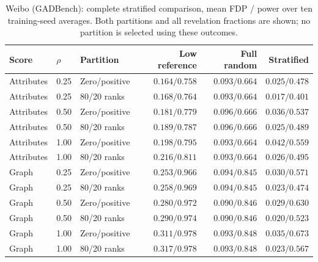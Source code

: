 \begin{table}[t]\centering\small
\caption{Weibo (GADBench): complete stratified comparison, mean FDP / power over ten training-seed averages. Both partitions and all revelation fractions are shown; no partition is selected using these outcomes.}
\begin{tabular}{lllrrr}\toprule Score & $\rho$ & Partition & Low reference & Full random & Stratified\\\midrule
Attributes & 0.25 & Zero/positive & $0.164/0.758$ & $0.093/0.664$ & $0.025/0.478$ \\
Attributes & 0.25 & 80/20 ranks & $0.168/0.764$ & $0.093/0.664$ & $0.017/0.401$ \\
Attributes & 0.50 & Zero/positive & $0.181/0.779$ & $0.096/0.666$ & $0.036/0.537$ \\
Attributes & 0.50 & 80/20 ranks & $0.189/0.787$ & $0.096/0.666$ & $0.025/0.489$ \\
Attributes & 1.00 & Zero/positive & $0.198/0.795$ & $0.093/0.664$ & $0.042/0.559$ \\
Attributes & 1.00 & 80/20 ranks & $0.216/0.811$ & $0.093/0.664$ & $0.026/0.495$ \\
Graph & 0.25 & Zero/positive & $0.253/0.966$ & $0.094/0.845$ & $0.030/0.571$ \\
Graph & 0.25 & 80/20 ranks & $0.258/0.969$ & $0.094/0.845$ & $0.023/0.474$ \\
Graph & 0.50 & Zero/positive & $0.280/0.972$ & $0.090/0.846$ & $0.029/0.630$ \\
Graph & 0.50 & 80/20 ranks & $0.290/0.974$ & $0.090/0.846$ & $0.020/0.523$ \\
Graph & 1.00 & Zero/positive & $0.311/0.978$ & $0.093/0.848$ & $0.035/0.673$ \\
Graph & 1.00 & 80/20 ranks & $0.317/0.978$ & $0.093/0.848$ & $0.023/0.567$ \\
\bottomrule\end{tabular}\end{table}